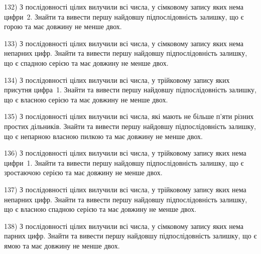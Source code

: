 \documentclass[12pt, ukrainian]{article}
\begin{document}
\par
\vspace{0.9cm}
132) \space 
З послідовності цілих вилучили всі числа, у сімковому запису яких нема цифри~2. Знайти та вивести першу найдовшу підпослідовність залишку, що є горою та має довжину не менше двох.

\par
\vspace{0.9cm}
133) \space 
З послідовності цілих вилучили всі числа, у сімковому запису яких нема непарних цифр. Знайти та вивести першу найдовшу підпослідовність залишку, що є спадною серією та має довжину не менше двох.

\par
\vspace{0.9cm}
134) \space 
З послідовності цілих вилучили всі числа, у трійковому запису яких присутня цифра~1. Знайти та вивести першу найдовшу підпослідовність залишку, що є власною серією та має довжину не менше двох.

\par
\vspace{0.9cm}
135) \space 
З послідовності цілих вилучили всі числа, які мають не більше п'яти різних простих дільників. Знайти та вивести першу найдовшу підпослідовність залишку, що є непарною власною пилкою та має довжину не менше двох.

\par
\vspace{0.9cm}
136) \space 
З послідовності цілих вилучили всі числа, у трійковому запису яких нема цифри~1. Знайти та вивести першу найдовшу підпослідовність залишку, що є зростаючою серією та має довжину не менше двох.

\par
\vspace{0.9cm}
137) \space 
З послідовності цілих вилучили всі числа, у трійковому запису яких нема непарних цифр. Знайти та вивести першу найдовшу підпослідовність залишку, що є власною спадною серією та має довжину не менше двох.

\par
\vspace{0.9cm}
138) \space 
З послідовності цілих вилучили всі числа, у сімковому запису яких нема парних цифр. Знайти та вивести першу найдовшу підпослідовність залишку, що є ямою та має довжину не менше двох.
\end{document}
